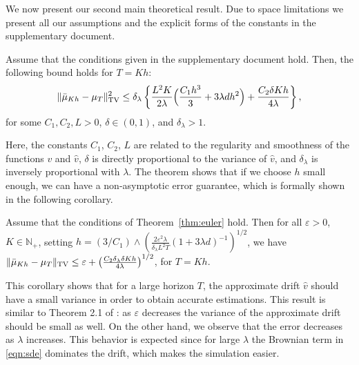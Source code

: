 We now present our second main theoretical result. Due to space limitations we present all our assumptions and the explicit forms of the constants in the supplementary document. 
\vspace{-5pt}
\begin{thm}
\label{thm:euler}
Assume that the conditions given in the supplementary document hold. Then, the following bound holds for $T=Kh$:
\begin{align}
\| \bar{\mu}_{Kh} - \mu_T \|_{\textnormal{TV}}^2 \leq \delta_\lambda \left \lbrace  \frac{L^2 K}{2\lambda} \Bigl( \frac{C_1 h^3}{3} + 3 \lambda d h^2 \Bigr) + \frac{C_2  \delta K h}{4\lambda} \right \rbrace	,
\end{align} 
for some $C_1,C_2,L >0$, $\delta \in (0,1)$, and $\delta_\lambda >1$.  %
\end{thm}
Here, the constants $C_1$, $C_2$, $L$ are related to the regularity and smoothness of the functions $v$ and $\hat{v}$, $\delta$ is directly proportional to the variance of $\hat{v}$, and $\delta_\lambda$ is inversely proportional with $\lambda$. The theorem shows that 
if we choose $h$ small enough, we can have a non-asymptotic error guarantee, which is formally shown in the following corollary. 
\vspace{-5pt}
\begin{cor}
  \label{coro:precision}
  Assume that the conditions of Theorem~\ref{thm:euler} hold. Then for all $\varepsilon >0$, $K \in \mathbb{N}_+$, setting
$h = (3/C_1)\wedge\left(\frac{2 \varepsilon^2 \lambda}{\delta_\lambda L^2 T}(1+3\lambda d)^{-1}\right)^{1/2}$, %
  we have
    $\| \bar{\mu}_{Kh} - \mu_T \|_{\textnormal{TV}} \leq \varepsilon + \left(\frac{C_2 \delta_\lambda \delta K h}{4\lambda}\right)^{1/2} $, for $T=Kh$. 
\end{cor}
This corollary shows that for a large horizon $T$, the approximate drift $\hat{v}$ should have a small variance in order to obtain accurate estimations. This result is similar to Theorem 2.1 of \cite{raginsky17a}: as $\varepsilon$ decreases the variance of the approximate drift should be small as well. On the other hand, we observe that the error decreases as $\lambda$ increases. This behavior is expected since for large $\lambda$ the Brownian term in \eqref{eqn:sde} dominates the drift, which makes the simulation easier.
